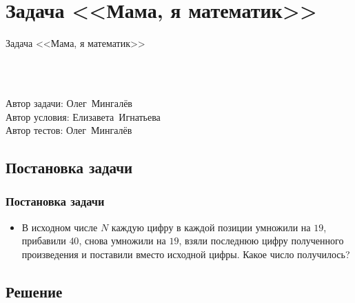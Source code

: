 \section{Задача <<Мама, я математик>>}


\begin{frame}
    \begin{center}
        \Huge Задача <<Мама, я математик>>
    \end{center}
    ~\\~\\
    \begin{center}
        Автор задачи: Олег~Мингалёв\\
        Автор условия: Елизавета~Игнатьева\\
        Автор тестов: Олег~Мингалёв
    \end{center}
\end{frame}

\subsection{Постановка задачи}

\begin{frame}
    \frametitle{Постановка задачи}

    \begin{itemize}
        \item В исходном числе $N$ каждую цифру в каждой позиции умножили на $19$, прибавили $40$, снова умножили на $19$, взяли последнюю цифру полученного произведения и поставили вместо исходной цифры. Какое число получилось?
    \end{itemize}
\end{frame}

\subsection{Решение}

